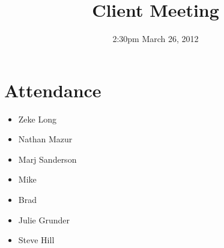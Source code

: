 \documentclass{article}
\begin{document}
\title{Client Meeting}
\date{2:30pm March 26, 2012}
\maketitle

\section{Attendance}
\begin{itemize}
\item Zeke Long
\item Nathan Mazur
\item Marj Sanderson
\item Mike
\item Brad
\item Julie Grunder
\item Steve Hill
\end{itemize}
\end{document}
